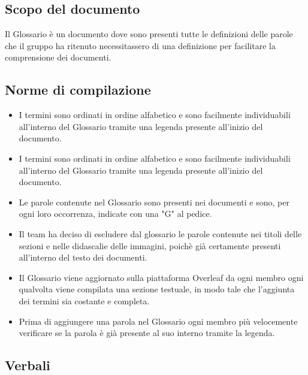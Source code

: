 \documentclass{article}
\begin{document}
\subsection*{Scopo del documento}
Il Glossario è un documento dove sono presenti tutte le definizioni delle parole che il gruppo ha ritenuto necessitassero di una definizione per facilitare la comprensione dei documenti. 
\subsection*{Norme di compilazione}
\begin{itemize}
    \item I termini sono ordinati in ordine alfabetico e sono facilmente individuabili all'interno del Glossario tramite una legenda presente all'inizio del documento.
    \item I termini sono ordinati in ordine alfabetico e sono facilmente individuabili all'interno del Glossario tramite una legenda presente all'inizio del documento.
    \item Le parole contenute nel Glossario sono presenti nei documenti e sono, per ogni loro occorrenza, indicate con una "G" al pedice.
    \item Il team ha deciso di escludere dal glossario le parole contenute nei titoli delle sezioni e nelle didascalie delle immagini, poichè già certamente presenti all'interno del testo dei documenti. 
    \item Il Glossario viene aggiornato sulla piattaforma Overleaf da ogni membro ogni qualvolta viene compilata una sezione testuale, in modo tale che l'aggiunta dei termini sia costante e completa. 
    \item Prima di aggiungere una parola nel Glossario ogni membro più velocemente verificare se la parola è già presente al suo interno tramite la legenda.
\end{itemize}  

\subsection{Verbali}
\end{document}
